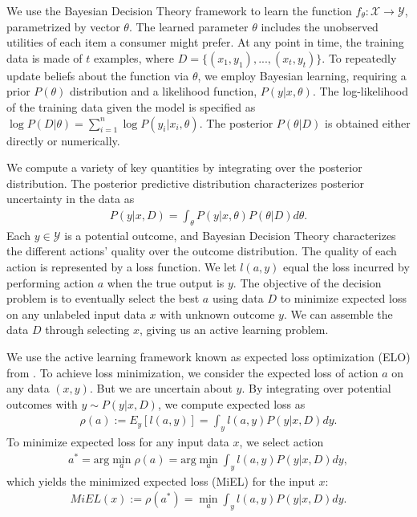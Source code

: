 \documentclass[nonblindrev]{informs3}
\newcommand{\numperset}{L}
\begin{document}
%

We use the Bayesian Decision Theory framework to learn the function $f_\theta: \mathcal{X} \to \mathcal{Y}$, parametrized by vector $\theta$. The learned parameter $\theta$ includes the unobserved utilities of each item a consumer might prefer. At any point in time, the training data is made of $t$ examples, where $D = \{ (x_1,y_1),...,(x_t,y_t) \}$. To repeatedly update beliefs about the function via $\theta$, we employ Bayesian learning, requiring a prior $P(\theta)$ distribution and a likelihood function, $P(y|x,\theta)$. The log-likelihood of the training data given the model is specified as $\log P(D|\theta) = \sum_{i=1}^n \log P(y_i|x_i,\theta)$. The posterior $P(\theta|D)$ is obtained either directly or numerically.

We compute a variety of key quantities by integrating over the posterior distribution. The posterior predictive distribution characterizes posterior uncertainty in the data as
\begin{align} 
P(y|x,D) = \int_\theta P(y|x,\theta)P(\theta|D)d\theta .
\end{align}
Each $y \in \mathcal{Y}$ is a potential outcome, and Bayesian Decision Theory characterizes the different actions' quality over the outcome distribution. The quality of each action is represented by a loss function. We let $l(a,y)$ equal the loss incurred by performing action $a$ when the true output is $y$. The objective of the decision problem is to eventually select the best $a$ using data $D$ to minimize expected loss on any unlabeled input data $x$ with unknown outcome $y$. We can assemble the data $D$ through selecting $x$, giving us an active learning problem.

We use the active learning framework known as expected loss optimization (ELO) from \cite{long2010elo}. To achieve loss minimization, we consider the expected loss of action $a$ on any data  $(x,y)$. But we are uncertain about $y$. By integrating over potential outcomes with $y \sim P(y|x,D)$, we compute expected loss as
\begin{align}
\rho(a) := E_{y} \left[ l(a,y) \right] = \int_y l(a,y) P(y|x,D) dy .
\end{align}To minimize expected loss for any input data $x$, we select action
\begin{align}
a^{*} = \text{arg}\min_a \rho(a) = \text{arg}\min_a \int_y l(a,y) P(y|x,D) dy,
\end{align}which yields the minimized expected loss (MiEL) for the input $x$:
\begin{align}
MiEL(x) := \rho(a^{*}) = \min_a \int_y l(a,y) P(y|x,D) dy .
\end{align}
\end{document}
